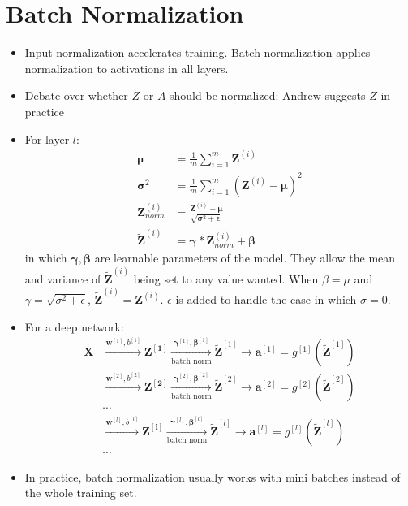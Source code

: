 \section{Batch Normalization}
\begin{itemize}
  \item Input normalization accelerates training. Batch normalization applies normalization to activations in all layers.
  \item Debate over whether $Z$ or $A$ should be normalized: Andrew suggests $Z$ in practice
  \item For layer $l$:
  \begin{align*}
    \pmb{\mu}&=\frac{1}{m}\displaystyle\sum_{i=1}^m\mathbf{Z}^{(i)}\\
    \pmb{\sigma}^2&=\frac{1}{m}\displaystyle\sum_{i=1}^m\left(\mathbf{Z}^{(i)}-\pmb{\mu}\right)^2\\
    \mathbf{Z}^{(i)}_{norm}&=\frac{\mathbf{Z}^{(i)}-\pmb{\mu}}{\sqrt{\pmb{\sigma}^2+\pmb{\epsilon}}}\\
    \mathbf{\tilde{Z}}^{(i)}&=\pmb{\gamma}*\mathbf{Z}^{(i)}_{norm}+\pmb{\beta}
  \end{align*}
  in which $\pmb{\gamma}, \pmb{\beta}$ are learnable parameters of the model. They allow the mean and variance of $\mathbf{\tilde{Z}}^{(i)}$ being set to any value wanted. When $\beta=\mu$ and $\gamma=\sqrt{\sigma^2+\epsilon}$, $\mathbf{\tilde{Z}}^{(i)}=\mathbf{Z}^{(i)}$. $\epsilon$ is added to handle the case in which $\sigma=0$.
  \item For a deep network:
  \begin{align*}
  \mathbf{X}&\xrightarrow{\mathbf{w}^{[1]}, b^{[1]}}\mathbf{Z^{[1]}}\xrightarrow[\text{batch norm}]{\pmb{\gamma}^{[1]},\pmb{\beta}^{[1]}}\mathbf{\tilde{Z}}^{[1]}\rightarrow \mathbf{a}^{[1]}=g^{[1]}\left(\mathbf{\tilde{Z}}^{[1]}\right)\\
  &\xrightarrow{\mathbf{w}^{[2]}, b^{[2]}}\mathbf{Z^{[2]}}\xrightarrow[\text{batch norm}]{\pmb{\gamma}^{[2]},\pmb{\beta}^{[2]}}\mathbf{\tilde{Z}}^{[2]}\rightarrow \mathbf{a}^{[2]}=g^{[2]}\left(\mathbf{\tilde{Z}}^{[2]}\right)\\
  &\cdots\\
  &\xrightarrow{\mathbf{w}^{[l]}, b^{[l]}}\mathbf{Z^{[l]}}\xrightarrow[\text{batch norm}]{\pmb{\gamma}^{[l]},\pmb{\beta}^{[l]}}\mathbf{\tilde{Z}}^{[l]}\rightarrow \mathbf{a}^{[l]}=g^{[l]}\left(\mathbf{\tilde{Z}}^{[l]}\right)\\
  &\cdots
  \end{align*}
  \item In practice, batch normalization usually works with mini batches instead of the whole training set.

\end{itemize}

